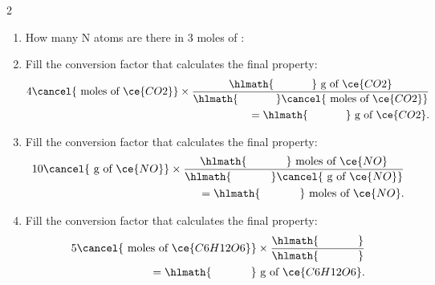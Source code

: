 \documentclass[main.tex]{subfiles}
\begin{document}
\begin{multicols*}{2}
\begin{enumerate}
\item How many N atoms are there in 3 moles of :
\begin{enumerate}[label=(\alph*)]
\end{enumerate}

\item Fill the conversion factor that calculates the final property:
 \begin{equation*}\begin{split}
4\cancel{\text{ moles of }\ce{CO2}} \times \dfrac{\hlmath{\hspace{35pt}}\text{ g of }\ce{CO2}}{\hlmath{\hspace{35pt}}\cancel{\text{ moles of }\ce{CO2}}}\\
=\hlmath{\hspace{35pt}}\text{ g of }\ce{CO2}.
\end{split}\end{equation*}


\item Fill the conversion factor that calculates the final property:
 \begin{equation*}\begin{split}
10\cancel{\text{ g of }\ce{NO}} \times \dfrac{\hlmath{\hspace{35pt}}\text{ moles of }\ce{NO}}{\hlmath{\hspace{35pt}}\cancel{\text{ g of }\ce{NO}}}\\
=\hlmath{\hspace{35pt}}\text{ moles of }\ce{NO}.
\end{split}\end{equation*}


\item Fill the conversion factor that calculates the final property:
 \begin{equation*}\begin{split}
5\cancel{\text{ moles of }\ce{C6H12O6}} \times \dfrac{\hlmath{\hspace{35pt}}}{\hlmath{\hspace{35pt}}}\\
=\hlmath{\hspace{35pt}}\text{ g of }\ce{C6H12O6}.
\end{split}\end{equation*}



\end{enumerate}
\end{multicols*}
\end{document}
